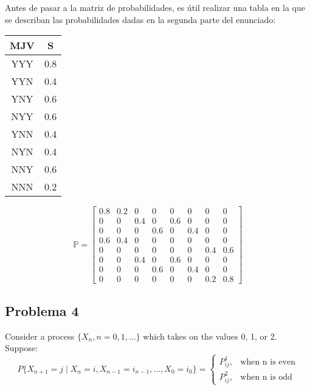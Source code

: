 \documentclass{article}
\begin{document}
            Antes de pasar a la matriz de probabilidades, es útil realizar una tabla en la que se describan las probabilidades dadas en la segunda parte del enunciado:

            \begin{table}
                \centering
                \begin{tabular}{ |c|c| }
                    \hline
                    MJV & S \\
                    \hline
                    YYY & 0.8 \\
                    YYN & 0.4 \\
                    YNY & 0.6 \\
                    NYY & 0.6 \\
                    YNN & 0.4 \\
                    NYN & 0.4 \\
                    NNY & 0.6 \\
                    NNN & 0.2 \\
                    \hline
                \end{tabular}
            \end{table}

            \begin{equation}
                \mathbb{P} = \begin{bmatrix}
                    0.8 & 0.2 & 0 & 0 & 0 & 0 & 0 & 0 \\
                    0 & 0 & 0.4 & 0 & 0.6 & 0 & 0 & 0 \\
                    0 & 0 & 0 & 0.6 & 0 & 0.4 & 0 & 0 \\
                    0.6 & 0.4 & 0 & 0 & 0 & 0 & 0 & 0 \\
                    0 & 0 & 0 & 0 & 0 & 0 & 0.4 & 0.6 \\
                    0 & 0 & 0.4 & 0 & 0.6 & 0 & 0 & 0 \\
                    0 & 0 & 0 & 0.6 & 0 & 0.4 & 0 & 0 \\
                    0 & 0 & 0 & 0 & 0 & 0 & 0.2 & 0.8
                \end{bmatrix}
            \end{equation}

        \subsection*{Problema 4}

            Consider a process $\{X_n,n = 0, 1,...\}$ which takes on the values 0, 1, or 2. Suppose:
            \begin{equation}
                P\{X_{n+1} = j \mid X_n = i, X_{n-1} = i_{n-1},...,X_0 = i_0\} = 
                    \begin{cases}
                        P_{ij}^{1}, & \text{when n is even} \\
                        P_{ij}^{2}, & \text{when n is odd}
                    \end{cases}
            \end{equation}
\end{document}
